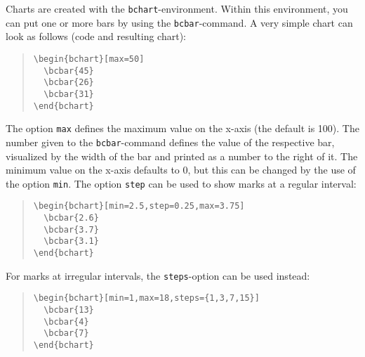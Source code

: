 \documentclass{article}
\begin{document}
Charts are created with the \texttt{bchart}-environment. Within this environment, you can put one or more bars by using the \texttt{bcbar}-command. A very simple chart can look as follows (code and resulting chart):
\begin{quote}\small
\begin{verbatim}
\begin{bchart}[max=50]
  \bcbar{45}
  \bcbar{26}
  \bcbar{31}
\end{bchart}
\end{verbatim}
\end{quote}
\begin{quote}
\begin{bchart}[max=50]
\end{bchart}
\end{quote}
The option \texttt{max} defines the maximum value on the x-axis (the default is 100). The number given to the \texttt{bcbar}-command defines the value of the respective bar, visualized by the width of the bar and printed as a number to the right of it. The minimum value on the x-axis defaults to 0, but this can be changed by the use of the option \texttt{min}. The option \texttt{step} can be used to show marks at a regular interval:
\begin{quote}\small
\begin{verbatim}
\begin{bchart}[min=2.5,step=0.25,max=3.75]
  \bcbar{2.6}
  \bcbar{3.7}
  \bcbar{3.1}
\end{bchart}
\end{verbatim}
\end{quote}
\begin{quote}
\begin{bchart}[min=2.5,step=0.25,max=3.75]
\end{bchart}
\end{quote}
For marks at irregular intervals, the \texttt{steps}-option can be used instead:
\begin{quote}\small
\begin{verbatim}
\begin{bchart}[min=1,max=18,steps={1,3,7,15}]
  \bcbar{13}
  \bcbar{4}
  \bcbar{7}
\end{bchart}
\end{verbatim}
\end{quote}
\begin{quote}
\begin{bchart}[min=1,max=18,steps={1,3,7,15}]
\end{bchart}
\end{quote}
\end{document}
